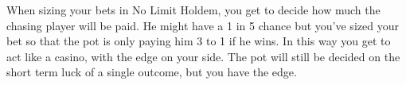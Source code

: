 When sizing your bets in No Limit Holdem, you get to decide how much
the chasing player will be paid. He might have a 1 in 5 chance
but you've sized your bet so that the pot is only paying him 3 to 1
if he wins. In this way you get to act like a casino, with the edge
on your side. The pot will still be decided on the short term luck
of a single outcome, but you have the edge.

